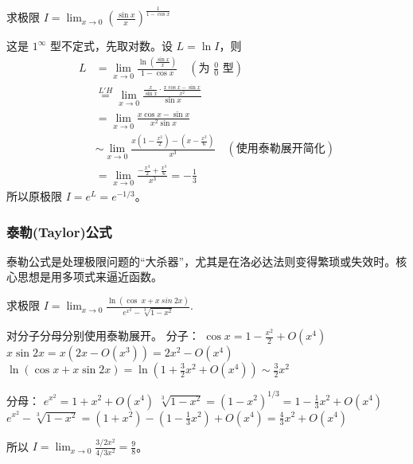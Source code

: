 \documentclass[lang=cn,newtx,10pt,scheme=chinese]{elegantbook}
\begin{document}
\begin{problem}[CMC真题]
    求极限 $I=\lim_{x\rightarrow0}(\frac{\sin x}{x})^{\frac{1}{1-\cos x}}$
\end{problem}
\begin{solution}
    这是 $1^\infty$ 型不定式，先取对数。设 $L = \ln I$，则
    \begin{align*}
        L &= \lim_{x\to 0} \frac{\ln(\frac{\sin x}{x})}{1-\cos x} \quad (\text{为 } \frac{0}{0} \text{ 型}) \\
        &\overset{L'H}{=} \lim_{x\to 0} \frac{\frac{x}{\sin x} \cdot \frac{x\cos x - \sin x}{x^2}}{\sin x} \\
        &= \lim_{x\to 0} \frac{x\cos x - \sin x}{x^2 \sin x} \\
        &\sim \lim_{x\to 0} \frac{x(1-\frac{x^2}{2}) - (x-\frac{x^3}{6})}{x^3} \quad (\text{使用泰勒展开简化}) \\
        &= \lim_{x\to 0} \frac{-\frac{x^3}{2} + \frac{x^3}{6}}{x^3} = -\frac{1}{3}
    \end{align*}
    所以原极限 $I = e^L = e^{-1/3}$。
\end{solution}

\subsubsection{泰勒(Taylor)公式}
泰勒公式是处理极限问题的“大杀器”，尤其是在洛必达法则变得繁琐或失效时。核心思想是用多项式来逼近函数。
\begin{problem}[CMC真题]
    求极限 $I=\lim_{x\rightarrow0}\frac{\ln(\cos~x+x~sin~2x)}{e^{x^{2}}-\sqrt[3]{1-x^{2}}}.$
\end{problem}
\begin{solution}
    对分子分母分别使用泰勒展开。
    分子：
    $\cos x = 1 - \frac{x^2}{2} + O(x^4)$
    $x \sin 2x = x(2x - O(x^3)) = 2x^2 - O(x^4)$
    $\ln(\cos x + x \sin 2x) = \ln(1 + \frac{3}{2}x^2 + O(x^4)) \sim \frac{3}{2}x^2$

    分母：
    $e^{x^2} = 1 + x^2 + O(x^4)$
    $\sqrt[3]{1-x^2} = (1-x^2)^{1/3} = 1 - \frac{1}{3}x^2 + O(x^4)$
    $e^{x^2} - \sqrt[3]{1-x^2} = (1+x^2) - (1-\frac{1}{3}x^2) + O(x^4) = \frac{4}{3}x^2 + O(x^4)$

    所以 $I = \lim_{x\to 0} \frac{3/2 x^2}{4/3 x^2} = \frac{9}{8}$。
\end{solution}
\end{document}
